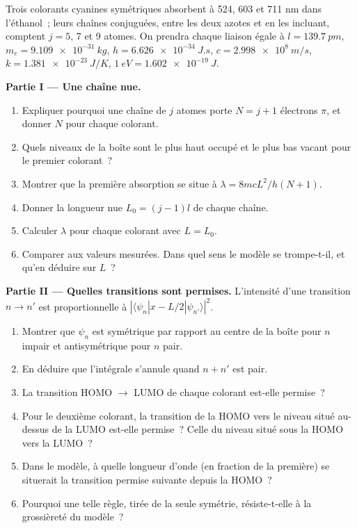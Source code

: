 \begin{problem}
\label{pb:b3:quantum-model-systems:1}
Trois colorants cyanines symétriques absorbent à 524, 603 et 711 nm dans
l'éthanol~; leurs chaînes conjuguées, entre les deux azotes et en les
incluant, comptent $j = 5$, 7
et 9 atomes. On prendra chaque liaison égale à $l = \qty{139.7}{pm}$, $m_e =
\qty{9.109e-31}{kg}$, $h = \qty{6.626e-34}{J.s}$, $c = \qty{2.998e8}{m/s}$,
$k = \qty{1.381e-23}{J/K}$, $\qty{1}{eV} = \qty{1.602e-19}{J}$.

\medskip\noindent\textbf{Partie I --- Une chaîne nue.}
\begin{enumerate}
  \item Expliquer pourquoi une chaîne de $j$ atomes porte $N = j + 1$
        électrons $\pi$, et donner $N$ pour chaque colorant.
  \item Quels niveaux de la boîte sont le plus haut occupé et le plus bas
        vacant pour le premier colorant~?
  \item Montrer que la première absorption se situe à $\lambda = 8mcL^2/h(N+1)$.
  \item Donner la longueur nue $L_0 = (j - 1)l$ de chaque chaîne.
  \item Calculer $\lambda$ pour chaque colorant avec $L = L_0$.
  \item Comparer aux valeurs mesurées. Dans quel sens le modèle se
        trompe-t-il, et qu'en déduire sur $L$~?
\end{enumerate}

\medskip\noindent\textbf{Partie II --- Quelles transitions sont permises.}
L'intensité d'une transition $n \to n'$ est proportionnelle à $|\langle
\psi_n|x - L/2|\psi_{n'}\rangle|^2$.
\begin{enumerate}[resume]
  \item Montrer que $\psi_n$ est symétrique par rapport au centre de la
        boîte pour $n$ impair et antisymétrique pour $n$ pair.
  \item En déduire que l'intégrale s'annule quand $n + n'$ est pair.
  \item La transition HOMO $\to$ LUMO de chaque colorant est-elle
        permise~?
  \item Pour le deuxième colorant, la transition de la HOMO vers le niveau
        situé au-dessus de la LUMO est-elle permise~? Celle du niveau situé
        sous la HOMO vers la LUMO~?
  \item Dans le modèle, à quelle longueur d'onde (en fraction de la
        première) se situerait la transition permise suivante depuis la
        HOMO~?
  \item Pourquoi une telle règle, tirée de la seule symétrie,
        résiste-t-elle à la grossièreté du modèle~?
\end{enumerate}


\end{problem}
